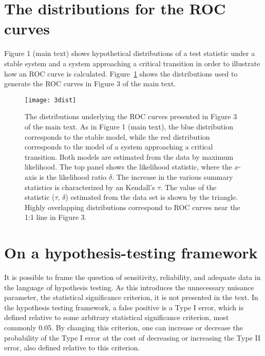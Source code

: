 \documentclass[authoryear, preprint,review,12pt]{elsarticle}
\begin{document}
\pagebreak
\section{The distributions for the ROC curves}
Figure 1 (main text) shows hypothetical distributions of a test statistic under a stable system and a system approaching a critical transition in order to illustrate how an ROC curve is calculated.  Figure~\ref{fig:3dist} shows the distributions used to generate the ROC curves in Figure 3 of the main text.  

\begin{figure}[!ht]
  \begin{center}
    \texttt{[image: 3dist]}
  \end{center}
  \caption{The distributions underlying the ROC curves presented in Figure 3 of the main text.  As in Figure 1 (main text), the blue distribution corresponds to the stable model, while the red distribution corresponds to the model of a system approaching a critical transition.  Both models are estimated from the data by maximum likelihood.  The top panel shows the likelihood statistic, where the $x$-axis is the likelihood ratio $\delta$.  The increase in the various summary statistics is characterized by an Kendall's $\tau$.  The value of the statistic ($\tau$, $\delta$) estimated from the data set is shown by the triangle. Highly overlapping distributions correspond to ROC curves near the 1:1 line in Figure 3.}
  \label{fig:3dist}
\end{figure}




\section{On a hypothesis-testing framework}\label{Dakos}
It is possible to frame the question of sensitivity, reliability, and adequate data in the language of hypothesis testing. As this introduces the unnecessary nuisance parameter, the statistical significance criterion, it is not presented in the text.  In the hypothesis testing framework, a false positive is a Type I error, which is defined relative to some arbitrary statistical significance criterion, most commonly 0.05.  By changing this criterion, one can increase or decrease the probability of the Type I error at the cost of decreasing or increasing the Type II error, also defined relative to this criterion.  
\end{document}
